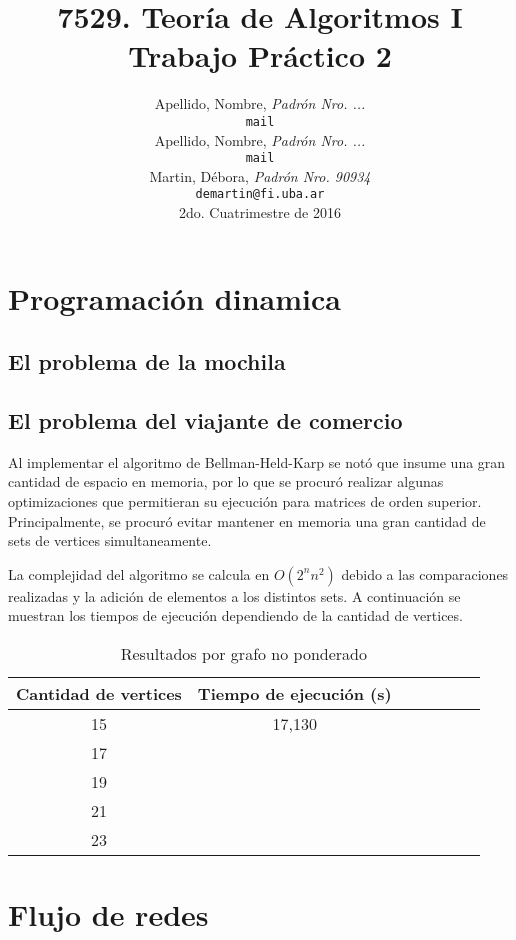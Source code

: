 \documentclass[a4paper,10pt]{article}
\title{ \textbf{ 7529. Teoría de Algoritmos I\\
Trabajo Práctico 2}}
\author{ Apellido, Nombre, \textit{Padrón Nro. ...} \\
\texttt{ mail } \\[2.5ex]
Apellido, Nombre, \textit{Padrón Nro. ...} \\
\texttt{ mail } \\[2.5ex]
Martin, Débora, \textit{Padrón Nro. 90934} \\
\texttt{ demartin@fi.uba.ar } \\[2.5ex]
\normalsize{2do. Cuatrimestre de 2016} \\
}
\date{}
\begin{document}
\maketitle
\thispagestyle{empty} %
\setcounter{page}{0}
\newpage
\tableofcontents

\newpage

\section{Programación dinamica}


\subsection{El problema de la mochila}






\subsection{El problema del viajante de comercio}
Al implementar el algoritmo de Bellman-Held-Karp se notó que insume una gran cantidad de espacio en memoria, por lo que se procuró realizar algunas optimizaciones que permitieran su ejecución para matrices de orden superior. Principalmente, se procuró evitar mantener en memoria una gran cantidad de sets de vertices simultaneamente.

La complejidad del algoritmo se calcula en $O(2^n n^2)$ debido a las comparaciones realizadas y la adición de elementos a los distintos sets. A continuación se muestran los tiempos de ejecución dependiendo de la cantidad de vertices.

\begin{table}[H]
\centering
\begin{tabular}{|c|c|c|c|c|c|c|}
\hline
Cantidad de vertices	& Tiempo de ejecución (s)\\\hline
15						& 17,130\\\hline
17						& \\\hline
19						& \\\hline
21						& \\\hline
23						& \\\hline
\end{tabular}
\caption{Resultados por grafo no ponderado}
\label{tab:datosexp}
\end{table}



\section{Flujo de redes}
\end{document}
